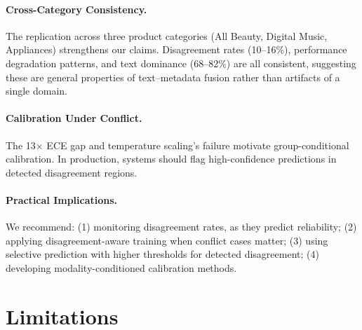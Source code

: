 \documentclass[11pt,a4paper]{article}
\begin{document}
\paragraph{Cross-Category Consistency.}
The replication across three product categories (All Beauty, Digital Music, Appliances) strengthens our claims.
Disagreement rates (10--16\%), performance degradation patterns, and text dominance (68--82\%) are all consistent, suggesting these are general properties of text--metadata fusion rather than artifacts of a single domain.

\paragraph{Calibration Under Conflict.}
The 13$\times$ ECE gap and temperature scaling's failure motivate group-conditional calibration.
In production, systems should flag high-confidence predictions in detected disagreement regions.

\paragraph{Practical Implications.}
We recommend:
(1) monitoring disagreement rates, as they predict reliability;
(2) applying disagreement-aware training when conflict cases matter;
(3) using selective prediction with higher thresholds for detected disagreement;
(4) developing modality-conditioned calibration methods.

\section{Limitations}
\end{document}
